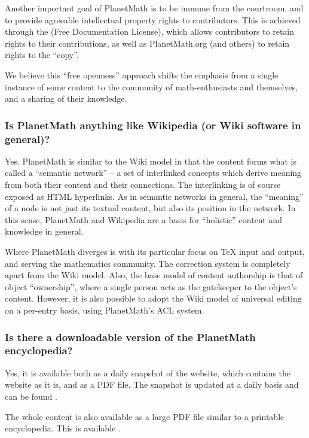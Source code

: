 Another important goal of PlanetMath is to be immune from the courtroom, and to provide agreeable intellectual property rights to contributors. This is achieved through the  (Free Documentation License), which allows contributors to retain rights to their contributions, as well as PlanetMath.org (and others) to retain rights to the ``copy''.

We believe this ``free openness'' approach shifts the emphasis from a single instance of some content to the community of math-enthusiasts and themselves, and a sharing of their knowledge.

\subsubsection*{Is PlanetMath anything like Wikipedia (or Wiki software in general)?}
Yes. PlanetMath is similar to the Wiki model in that the content forms what is called a ``semantic network'' -- a set of interlinked concepts which derive meaning from both their content and their connections. The interlinking is of course exposed as HTML hyperlinks. As in semantic networks in general, the ``meaning'' of a node is not just its textual content, but also its position in the network. In this sense, PlanetMath and Wikipedia are a basis for ``holistic'' content and knowledge in general.

Where PlanetMath diverges is with its particular focus on TeX input and output, and serving the mathematics community. The correction system is completely apart from the Wiki model. Also, the base model of content authorship is that of object ``ownership'', where a single person acts as the gatekeeper to the object's content. However, it is also possible to adopt the Wiki model of universal editing on a per-entry basis, using PlanetMath's ACL system.

\subsubsection*{Is there a downloadable version of the PlanetMath encyclopedia?}
Yes, it is available both as a daily snapshot of the website, which contains the website as it is, and as a PDF file. The snapshot is updated at a daily basis and can be found .

The whole content is also available as a large PDF file similar to a printable encyclopedia. This is available .

